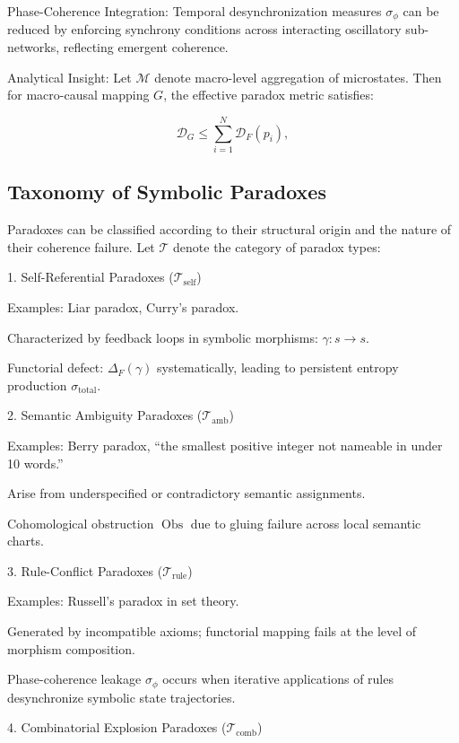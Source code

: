 \documentclass[12pt]{article}
\theoremstyle{plain}
\begin{document}
Phase-Coherence Integration: Temporal desynchronization measures \(\sigma_\phi\) can be reduced by enforcing synchrony conditions across interacting oscillatory sub-networks, reflecting emergent coherence.

Analytical Insight: Let \(\mathcal{M}\) denote macro-level aggregation of microstates. Then for macro-causal mapping \(G\), the effective paradox metric satisfies:

\begin{equation}
\mathcal{D}_G \leq \sum_{i=1}^N \mathcal{D}_F(p_i),
\end{equation}

\subsection{Taxonomy of Symbolic Paradoxes}

Paradoxes can be classified according to their structural origin and the nature of their coherence failure. Let \(\mathcal{T}\) denote the category of paradox types:

1. Self-Referential Paradoxes (\(\mathcal{T}_\text{self}\))

Examples: Liar paradox, Curry’s paradox.

Characterized by feedback loops in symbolic morphisms: \(\gamma: s \to s\).

Functorial defect: \(\Delta_F(\gamma)\) systematically, leading to persistent entropy production \(\sigma_{\mathrm{total}}\).

2. Semantic Ambiguity Paradoxes (\(\mathcal{T}_\text{amb}\))

Examples: Berry paradox, “the smallest positive integer not nameable in under 10 words.”

Arise from underspecified or contradictory semantic assignments.

Cohomological obstruction \(\operatorname{Obs}\) due to gluing failure across local semantic charts.

3. Rule-Conflict Paradoxes (\(\mathcal{T}_\text{rule}\))

Examples: Russell’s paradox in set theory.

Generated by incompatible axioms; functorial mapping fails at the level of morphism composition.

Phase-coherence leakage \(\sigma_\phi\) occurs when iterative applications of rules desynchronize symbolic state trajectories.

4. Combinatorial Explosion Paradoxes (\(\mathcal{T}_\text{comb}\))
\end{document}
